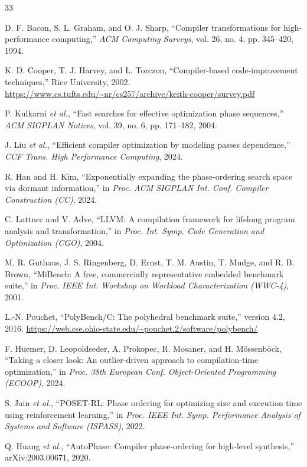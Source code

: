 \documentclass[conference]{IEEEtran}
\begin{document}
\begin{thebibliography}{33}

D. F. Bacon, S. L. Graham, and O. J. Sharp,
``Compiler transformations for high-performance computing,''
\textit{ACM Computing Surveys}, vol. 26, no. 4, pp. 345--420, 1994.

K. D. Cooper, T. J. Harvey, and L. Torczon,
``Compiler-based code-improvement techniques,'' Rice University, 2002.
\url{https://www.cs.tufts.edu/~nr/cs257/archive/keith-cooper/survey.pdf}

P. Kulkarni \textit{et al.},
``Fast searches for effective optimization phase sequences,''
\textit{ACM SIGPLAN Notices}, vol. 39, no. 6, pp. 171--182, 2004.

J. Liu \textit{et al.},
``Efficient compiler optimization by modeling passes dependence,''
\textit{CCF Trans. High Performance Computing}, 2024.

R. Han and H. Kim,
``Exponentially expanding the phase-ordering search space via dormant information,''
in \textit{Proc. ACM SIGPLAN Int. Conf. Compiler Construction (CC)}, 2024.

C. Lattner and V. Adve,
``LLVM: A compilation framework for lifelong program analysis and transformation,''
in \textit{Proc. Int. Symp. Code Generation and Optimization (CGO)}, 2004.

M. R. Guthaus, J. S. Ringenberg, D. Ernst, T. M. Austin, T. Mudge, and R. B. Brown,
``MiBench: A free, commercially representative embedded benchmark suite,''
in \textit{Proc. IEEE Int. Workshop on Workload Characterization (WWC-4)}, 2001.

L.-N. Pouchet,
``PolyBench/C: The polyhedral benchmark suite,'' version 4.2, 2016.
\url{https://web.cse.ohio-state.edu/~pouchet.2/software/polybench/}

F. Huemer, D. Leopoldseder, A. Prokopec, R. Mosaner, and H. M\"ossenb\"ock,
``Taking a closer look: An outlier-driven approach to compilation-time optimization,''
in \textit{Proc. 38th European Conf. Object-Oriented Programming (ECOOP)}, 2024.

S. Jain \textit{et al.},
``POSET-RL: Phase ordering for optimizing size and execution time using reinforcement learning,''
in \textit{Proc. IEEE Int. Symp. Performance Analysis of Systems and Software (ISPASS)}, 2022.

Q. Huang \textit{et al.},
``AutoPhase: Compiler phase-ordering for high-level synthesis,'' arXiv:2003.00671, 2020.


\end{thebibliography}
\end{document}

